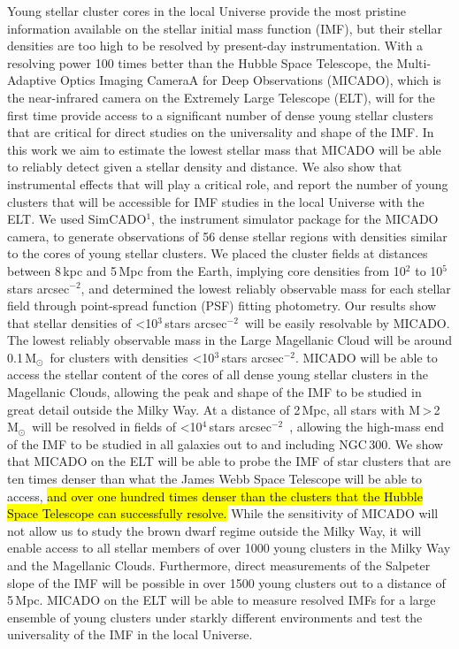 \documentclass{aa}
\newcommand{\msun}{M$_\odot$~}
\newcommand{\h}[1]{$^{#1}$}
\newcommand{\spa}{stars arcsec$^{-2}$~}
\newcommand{\spae}{stars arcsec$^{-2}$}
\begin{document}
  \abstract
{Young stellar cluster cores in the local Universe provide the most pristine information available on the stellar initial mass function (IMF), but their stellar densities are too high to be resolved by present-day instrumentation.
With a resolving power 100 times better than the Hubble Space Telescope, the Multi-Adaptive Optics Imaging CameraA for Deep Observations (MICADO), which is the near-infrared camera on the Extremely Large Telescope (ELT), will for the first time provide access to a significant number of dense young stellar clusters that are critical for direct studies on the universality and shape of the IMF.}
{In this work we aim to estimate the lowest stellar mass that MICADO will be able to reliably detect given a stellar density and distance.
We also show that instrumental effects that will play a critical role, and report the number of young clusters that will be accessible for IMF studies in the local Universe with the ELT.}
{We used SimCADO$^1$, the instrument simulator package for the MICADO camera, to generate observations of 56 dense stellar regions with densities similar to the cores of young stellar clusters.
We placed the cluster fields at distances between 8\,kpc and 5\,Mpc from the Earth, implying core densities from 10\h2 to 10\h5\,\spae, and determined the lowest reliably observable mass for each stellar field through point-spread function (PSF) fitting photometry.}
{Our results show that stellar densities of \textless10\h3\,\spa will be easily resolvable by MICADO. The lowest reliably observable mass in the Large Magellanic Cloud will be around 0.1\,\msun for clusters with densities \textless10\h3\,\spae.
MICADO will be able to access the stellar content of the cores of all dense young stellar clusters in the Magellanic Clouds, allowing the peak and shape of the IMF to be studied in great detail outside the Milky Way.
At a distance of 2\,Mpc, all stars with M\,\textgreater\,2\,\msun will be resolved in fields of \textless10\h4\,\spa, allowing the high-mass end of the IMF to be studied in all galaxies out to and including NGC\,300.}
{We show that MICADO on the ELT will be able to probe the IMF of star clusters that are ten times denser than what the James Webb Space Telescope will be able to access,
\hl{and over one hundred times denser than the clusters that the Hubble Space Telescope can successfully resolve.}
While the sensitivity of MICADO will not allow us to study the brown dwarf regime outside the Milky Way, it will enable access to all stellar members of over 1000 young clusters in the Milky Way and the Magellanic Clouds.
Furthermore, direct measurements of the Salpeter slope of the IMF will be possible in over 1500 young clusters out to a distance of 5\,Mpc.
MICADO on the ELT will be able to measure resolved IMFs for a large ensemble of young clusters under starkly different environments and test the universality of the IMF in the local Universe.}
\end{document}
